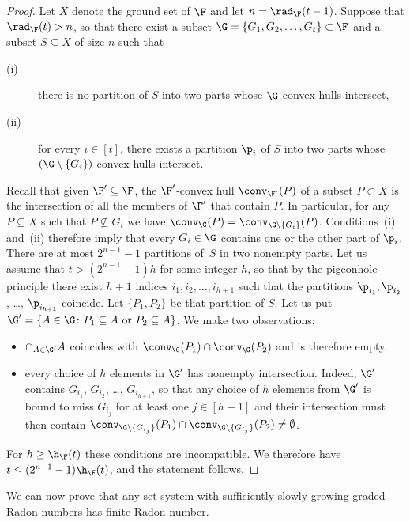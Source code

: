 \begin{proof}
  Let $X$ denote the ground set of $\F$ and let $n = \rad_\F(t-1)$. Suppose that $\rad_\F(t)>n$, so that there exist a subset $\G = \{G_1,G_2, \ldots, G_t\} \subset \F$ and a subset $S \subseteq X$ of size $n$ such that
%
\begin{description}
\item[(i)] there is no partition of $S$ into two parts whose $\G$-convex hulls intersect,\medskip
\item[(ii)] for every $i \in [t]$, there exists a partition $\p_i$ of $S$ into two parts whose $(\G\setminus \{G_i\})$-convex hulls intersect.
\end{description}
%
\noindent
Recall that given $\F' \subseteq \F$, the $\F'$-convex hull $\conv_{\F'}(P)$ of a subset $P\subset X$ is the intersection of all the members of $\F'$ that contain $P$. In particular, for any $P \subseteq X$ such that $P \not \subseteq G_{i}$ we have $\conv_\G(P) = \conv_{\G\setminus \{G_{i}\}}(P)$. Conditions~(i) and~(ii) therefore imply that every $G_i \in \G$ contains one or the other part of $\p_i$.
%
\medskip
%
There are at most $2^{n-1}-1$ partitions of~$S$ in two nonempty parts. Let us assume that $t > (2^{n-1}-1)h$ for some integer $h$, so that by the pigeonhole principle there exist $h+1$ indices $i_1,i_2, \ldots, i_{h+1}$ such that the partitions $\p_{i_1}, \p_{i_2}$, \ldots, $\p_{i_{h+1}}$ coincide. Let $\{P_1,P_2\}$ be that partition of $S$. Let us put $\G' = \{ A \in \G \colon P_1 \subseteq A \text{ or } P_2 \subseteq A\}$. We make two observations:
%
\begin{itemize}
\item $\cap_{A \in \G'}A$ coincides with $\conv_{\G}(P_1) \cap \conv_{\G}(P_2)$ and is therefore empty.\medskip
\item every choice of $h$ elements in $\G'$ has nonempty intersection. Indeed, $\G'$ contains $G_{i_1}$, $G_{i_2}$, \ldots, $G_{i_{h+1}}$, so that any choice of $h$ elements from $\G'$ is bound to miss $G_{i_j}$ for at least one $j \in [h+1]$ and their intersection must then contain $\conv_{\G \setminus \{G_{i_j}\}}(P_1) \cap \conv_{\G \setminus \{G_{i_j}\}}(P_2) \neq \emptyset$. 
\end{itemize}
%
\noindent
For $h \ge \h_\F(t)$ these conditions are incompatible. We therefore have $t \le (2^{n-1}-1) \h_\F(t)$, and the statement follows.
\end{proof}
%
%
We can now prove that any set system with sufficiently slowly growing graded Radon numbers has finite Radon number.
